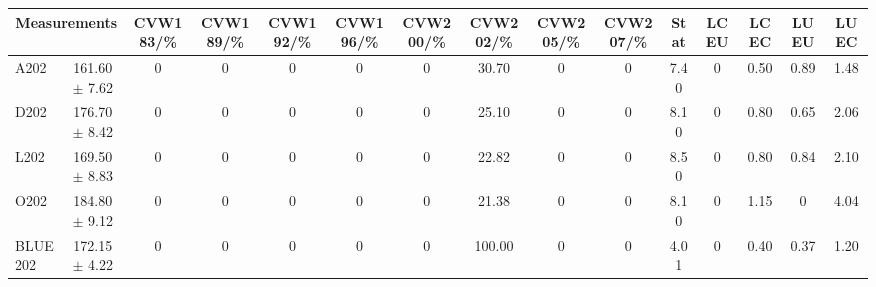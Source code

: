 \begin{table}[H]
\scriptsize
\begin{center}
\renewcommand{\arraystretch}{1.1}
\begin{tabular}{|lc|c|c|c|c|c|c|c|c|ccccc|}
\hline
\multicolumn{2}{|c|}{Measurements} & CVW{\tiny 183}/\%  & CVW{\tiny 189}/\%  & CVW{\tiny 192}/\%  & CVW{\tiny 196}/\%  & CVW{\tiny 200}/\%  & CVW{\tiny 202}/\%  & CVW{\tiny 205}/\%  & CVW{\tiny 207}/\%  & {\tiny Stat} & {\tiny LCEU} & {\tiny LCEC} & {\tiny LUEU} & {\tiny LUEC}\\
\hline
A202 &     161.60 $\pm$       7.62 &  0 &  0 &  0 &  0 &  0 &      30.70 &  0 &  0 &       7.40 &  0 &       0.50 &       0.89 &       1.48\\
D202 &     176.70 $\pm$       8.42 &  0 &  0 &  0 &  0 &  0 &      25.10 &  0 &  0 &       8.10 &  0 &       0.80 &       0.65 &       2.06\\
L202 &     169.50 $\pm$       8.83 &  0 &  0 &  0 &  0 &  0 &      22.82 &  0 &  0 &       8.50 &  0 &       0.80 &       0.84 &       2.10\\
O202 &     184.80 $\pm$       9.12 &  0 &  0 &  0 &  0 &  0 &      21.38 &  0 &  0 &       8.10 &  0 &       1.15 &  0 &       4.04\\
\hline
BLUE {\tiny 202} &     172.15 $\pm$       4.22 &  0 &  0 &  0 &  0 &  0 &     100.00 &  0 &  0 &       4.01 &  0 &       0.40 &       0.37 &       1.20\\
\hline
\end{tabular}
\renewcommand{\arraystretch}{1}
\end{center}
\end{table}
\vspace*{-0.5cm}
